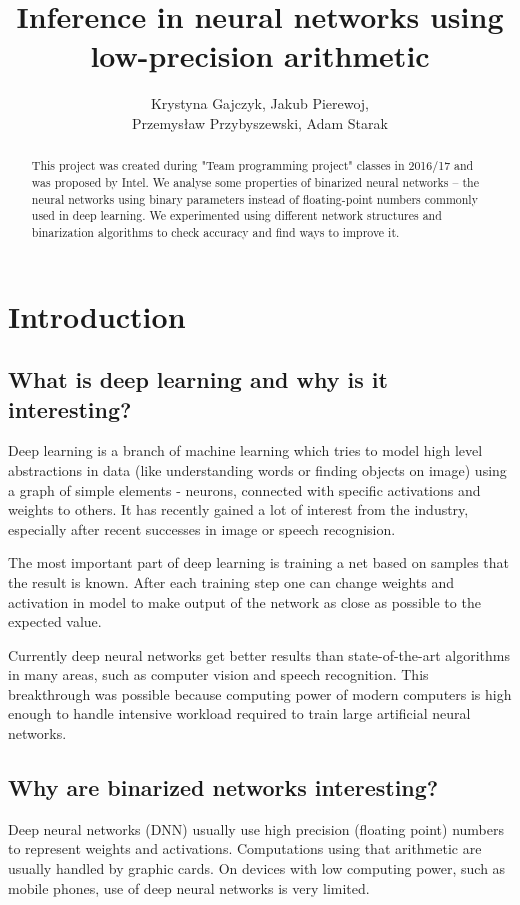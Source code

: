 \documentclass[licencjacka]{pracamgr}
\title{Inference in neural networks using low-precision arithmetic}
\author{Krystyna Gajczyk, Jakub Pierewoj,\\ Przemysław Przybyszewski, Adam Starak}
\begin{document}
\maketitle
\begin{abstract}
This project was created during "Team programming project" classes in 2016/17 and was proposed by Intel. We analyse some properties of binarized neural networks -- the neural networks using binary parameters instead of floating-point numbers commonly used in deep learning. We experimented using different network structures and binarization algorithms to check accuracy and find ways to improve it.
\end{abstract}

\tableofcontents

\chapter{Introduction}
	
\section{What is deep learning and why is it interesting?}

Deep learning is a branch of machine learning which tries to model high level abstractions in data (like understanding words or finding objects on image) using a graph of simple elements - neurons, connected with specific activations and weights to others. It has recently gained a lot of interest from the industry, especially after recent successes in image or speech recognision.

The most important part of deep learning is training a net based on samples that the result is known. After each training step one can change weights and activation in model to make output of the network as close as possible to the expected value.

Currently deep neural networks get better results than state-of-the-art algorithms in many areas, such as computer vision and speech recognition. This breakthrough was possible because computing power of modern computers is high enough to handle intensive workload required to train large artificial neural networks.

\section{Why are binarized networks interesting?}
	Deep neural networks (DNN) usually use high precision (floating point) numbers to represent
	weights and activations. Computations using that arithmetic are usually handled by
	graphic cards. On devices with low computing power, such as mobile phones, use of deep neural networks is very limited.
	
\end{document}
